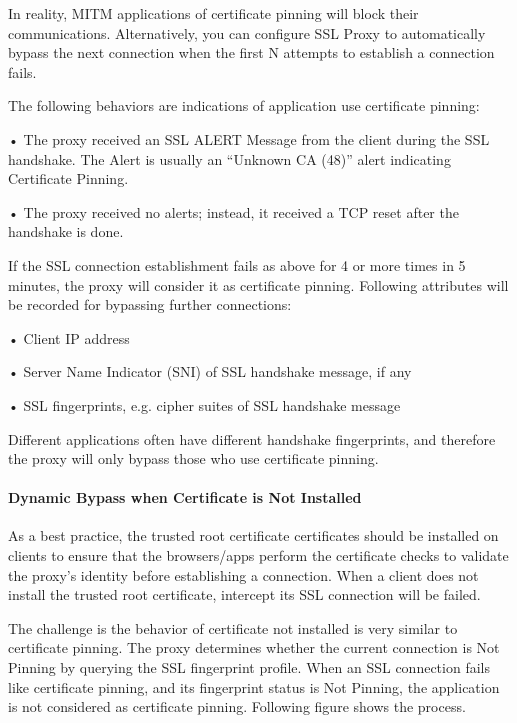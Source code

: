 In reality, MITM applications of certificate pinning will block their communications. 
Alternatively, you can configure SSL Proxy to automatically bypass the next connection when the first N attempts to establish a connection fails.


The following behaviors are indications of application use certificate pinning:

• The proxy received an SSL ALERT Message from the client during the SSL handshake. The Alert is usually an “Unknown CA (48)” alert indicating Certificate Pinning.


• The proxy received no alerts; instead, it received a TCP reset after the handshake is done.


If the SSL connection establishment fails as above for 4 or more times in 5 minutes, the proxy will consider it as certificate pinning. 
Following attributes will be recorded for bypassing further connections:


• Client IP address


• Server Name Indicator (SNI) of SSL handshake message, if any


• SSL fingerprints, e.g. cipher suites of SSL handshake message


Different applications often have different handshake fingerprints, and therefore the proxy will only bypass those who use certificate pinning. 

\hypertarget{link:Dynamic Bypass when Certificate is Not Installed}{\paragraph{Dynamic Bypass when Certificate is Not Installed}}
\label{sec:decrypt:profile:decryptionprofile:bypass:notinstalled}

As a best practice, the trusted root certificate certificates should be installed on clients to ensure that the browsers/apps perform the certificate checks to 
validate the proxy's identity before establishing a connection. When a client does not install the trusted root certificate, intercept its SSL connection will be failed.


The challenge is the behavior of certificate not installed is very similar to certificate pinning. 
The proxy determines whether the current connection is Not Pinning by querying the SSL fingerprint profile. 
When an SSL connection fails like certificate pinning, and its fingerprint status is Not Pinning, the application is not considered as certificate pinning. 
Following figure shows the process.


